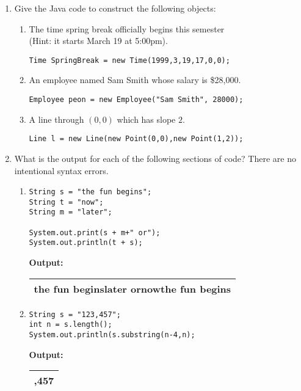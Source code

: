\begin{enumerate}
    \item Give the Java code to construct the following objects:
\begin{enumerate}
            \item The time spring break officially begins this semester\\
            (Hint: it starts March 19 at 5:00pm).
\begin{verbatim}
Time SpringBreak = new Time(1999,3,19,17,0,0);
\end{verbatim}

            \item An employee named Sam Smith whose salary is \$28,000.
\begin{verbatim}
Employee peon = new Employee("Sam Smith", 28000);
\end{verbatim}


            \item A line through $(0,0)$ which has slope $2$.
\begin{verbatim}
Line l = new Line(new Point(0,0),new Point(1,2));
\end{verbatim}


\end{enumerate}
    \item What is the output for each of the following sections of code?
    There are no intentional syntax errors.
\begin{enumerate}
\item

\begin{verbatim}
String s = "the fun begins";
String t = "now";
String m = "later";

System.out.print(s + m+" or");
System.out.println(t + s);

\end{verbatim}

       {\bf Output:}
        \begin{tabular}{|c|}
            \hline
            the fun beginslater ornowthe fun begins\\
            \hline
        \end{tabular}

\item
\begin{verbatim}
String s = "123,457";
int n = s.length();
System.out.println(s.substring(n-4,n);
\end{verbatim}

        {\bf Output:}
        \begin{tabular}{|c|}
            \hline
            ,457\\
            \hline
        \end{tabular}


\end{enumerate}
\end{enumerate}
